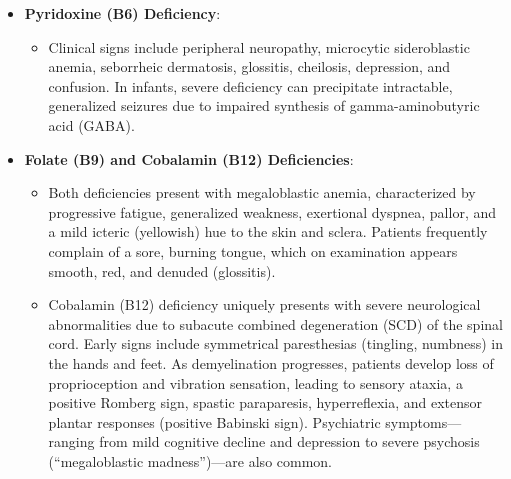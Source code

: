 \begin{itemize}
\begin{itemize}
        \item Classically defined by the ``four Ds'':
        \item \textit{Dermatitis}: A symmetric, photosensitive rash that resembles a severe sunburn. The skin becomes hyperpigmented, thickened, scaling, and cracked. It typically affects sun-exposed areas, forming a well-demarcated collar around the neck (Casal's necklace) and glove-like lesions on the hands.
        \item \textit{Diarrhea}: Due to mucosal atrophy and inflammation of the entire gastrointestinal tract, causing chronic, watery diarrhea, anorexia, and abdominal pain.
        \item \textit{Dementia}: Neurological signs start with insomnia, fatigue, and irritability, progressing to depression, confusion, hallucinations, paranoia, and severe cognitive impairment.
        \item \textit{Death}: Occurs in untreated, advanced cases due to severe malnutrition, dehydration, and multi-organ failure.
    \end{itemize}
    \item \textbf{Pyridoxine (B6) Deficiency}:
    \begin{itemize}
        \item Clinical signs include peripheral neuropathy, microcytic sideroblastic anemia, seborrheic dermatosis, glossitis, cheilosis, depression, and confusion. In infants, severe deficiency can precipitate intractable, generalized seizures due to impaired synthesis of gamma-aminobutyric acid (GABA).
    \end{itemize}
    \item \textbf{Folate (B9) and Cobalamin (B12) Deficiencies}:
    \begin{itemize}
        \item Both deficiencies present with megaloblastic anemia, characterized by progressive fatigue, generalized weakness, exertional dyspnea, pallor, and a mild icteric (yellowish) hue to the skin and sclera. Patients frequently complain of a sore, burning tongue, which on examination appears smooth, red, and denuded (glossitis).
        \item Cobalamin (B12) deficiency uniquely presents with severe neurological abnormalities due to subacute combined degeneration (SCD) of the spinal cord. Early signs include symmetrical paresthesias (tingling, numbness) in the hands and feet. As demyelination progresses, patients develop loss of proprioception and vibration sensation, leading to sensory ataxia, a positive Romberg sign, spastic paraparesis, hyperreflexia, and extensor plantar responses (positive Babinski sign). Psychiatric symptoms---ranging from mild cognitive decline and depression to severe psychosis (``megaloblastic madness'')---are also common.
    \end{itemize}
\end{itemize}

